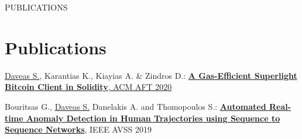 \documentclass[]{deedy-resume-openfont}
\begin{document}
\begin{minipage}[t]{0.66\textwidth}
    PUBLICATIONS

\section{Publications}

\underline{Daveas S.}, Karantias K., Kiayias A. \& Zindros D.: \href{https://dl.acm.org/doi/abs/10.1145/3419614.3423255?casa_token=NmylSoSMSJgAAAAA:yOyuE4bgCLLp8HQP0MHzGegNr6IVBofjx77nBAiDxN6WzWIzarMpyMD14UMf5Wki-guZkenxekT2qw}{\textbf{A Gas-Efficient
Superlight Bitcoin Client in Solidity}, ACM AFT 2020}

Bouritsas G., \underline{Daveas S.} Danelakis A. and Thomopoulos S.:
\href{https://ieeexplore.ieee.org/abstract/document/8909844/?casa_token=NlZHO6W9_ewAAAAA:2Q2vSiR0ynu72R9iaYASHe5FzuNVAtfDrmnj0VmEk1sBZ-P74vnzKELd71hpL59byzko7acsjf5Nlw}{\textbf{
Automated Real-time Anomaly Detection in Human Trajectories using Sequence to
Sequence Networks}},
IEEE AVSS 2019
\sectionsep

\end{minipage}
\end{document}
